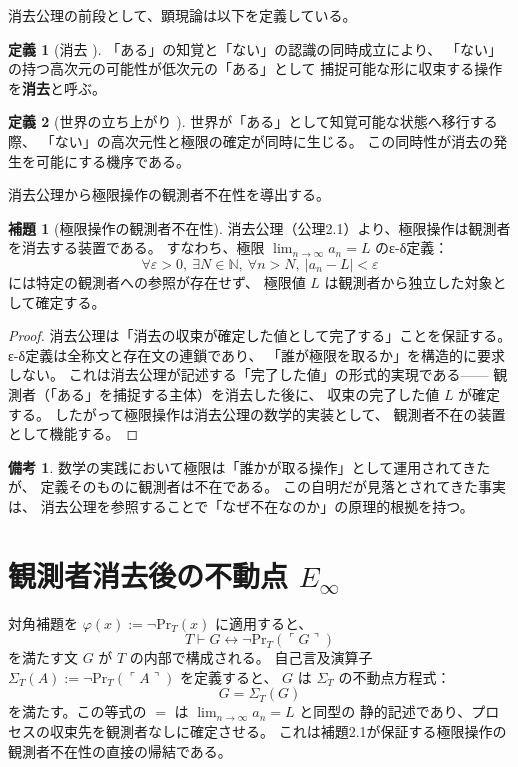 \documentclass[11pt,a4paper]{article}
\theoremstyle{definition}
\newtheorem{definition}{定義}[section]
\newtheorem{lemma}{補題}[section]
\newtheorem{remark}{備考}[section]
\newcommand{\Einfty}{E_\infty}
\newcommand{\SelfRef}{\Sigma}
\renewcommand{\Pr}{\mathrm{Pr}}
\begin{document}
消去公理の前段として、顕現論は以下を定義している。

\begin{definition}[消去 \cite{Chiba2026_chikaku} ]
「ある」の知覚と「ない」の認識の同時成立により、
「ない」の持つ高次元の可能性が低次元の「ある」として
捕捉可能な形に収束する操作を\textbf{消去}と呼ぶ。
\end{definition}

\begin{definition}[世界の立ち上がり \cite{Chiba2026_chikaku} ]
世界が「ある」として知覚可能な状態へ移行する際、
「ない」の高次元性と極限の確定が同時に生じる。
この同時性が消去の発生を可能にする機序である。
\end{definition}

消去公理から極限操作の観測者不在性を導出する。

\begin{lemma}[極限操作の観測者不在性]
消去公理（公理2.1）より、極限操作は観測者を消去する装置である。
すなわち、極限 $\lim_{n \to \infty} a_n = L$ のε-δ定義：
$$\forall \varepsilon > 0,\ \exists N \in \mathbb{N},\ \forall n > N,\
|a_n - L| < \varepsilon$$
には特定の観測者への参照が存在せず、
極限値 $L$ は観測者から独立した対象として確定する。
\end{lemma}

\begin{proof}
消去公理は「消去の収束が確定した値として完了する」ことを保証する。
ε-δ定義は全称文と存在文の連鎖であり、
「誰が極限を取るか」を構造的に要求しない。
これは消去公理が記述する「完了した値」の形式的実現である——
観測者（「ある」を捕捉する主体）を消去した後に、
収束の完了した値 $L$ が確定する。
したがって極限操作は消去公理の数学的実装として、
観測者不在の装置として機能する。
\end{proof}

\begin{remark}
数学の実践において極限は「誰かが取る操作」として運用されてきたが、
定義そのものに観測者は不在である。
この自明だが見落とされてきた事実は、
消去公理を参照することで「なぜ不在なのか」の原理的根拠を持つ。
\end{remark}

\section{観測者消去後の不動点 $\Einfty$}

対角補題を $\varphi(x) := \neg \Pr_T(x)$ に適用すると、
$$T \vdash G \leftrightarrow \neg \Pr_T(\ulcorner G \urcorner)$$
を満たす文 $G$ が $T$ の内部で構成される。
自己言及演算子 $\SelfRef_T(A) := \neg \Pr_T(\ulcorner A \urcorner)$ を定義すると、
$G$ は $\SelfRef_T$ の不動点方程式：
$$G = \SelfRef_T(G)$$
を満たす。この等式の $=$ は $\lim_{n\to\infty} a_n = L$ と同型の
静的記述であり、プロセスの収束先を観測者なしに確定させる。
これは補題2.1が保証する極限操作の観測者不在性の直接の帰結である。
\end{document}
